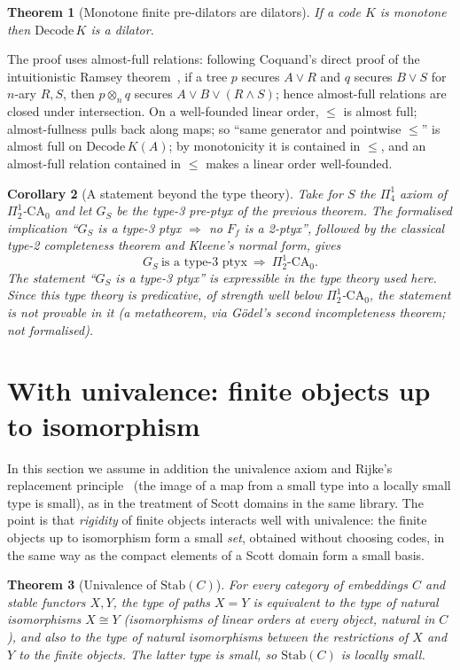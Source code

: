\documentclass[11pt]{article}
\newtheorem{theorem}{Theorem}[section]
\newtheorem{corollary}[theorem]{Corollary}
\theoremstyle{definition}
\theoremstyle{remark}
\newcommand{\Stab}{\mathrm{Stab}}
\begin{document}
\begin{theorem}[Monotone finite pre-dilators are dilators]
If a code $K$ is monotone then $\mathrm{Decode}\,K$ is a dilator.
\end{theorem}

The proof uses almost-full relations: following Coquand's direct proof of
the intuitionistic Ramsey theorem~\cite{CoqRamsey}, if a tree $p$ secures
$A\vee R$ and $q$ secures $B\vee S$ for $n$-ary $R,S$, then $p\otimes_n q$
secures $A\vee B\vee(R\wedge S)$; hence almost-full relations are closed
under intersection. On a well-founded linear order, $\le$ is almost full;
almost-fullness pulls back along maps; so ``same generator and pointwise
$\le$'' is almost full on $\mathrm{Decode}\,K(A)$; by monotonicity it is
contained in $\le$, and an almost-full relation contained in $\le$ makes a
linear order well-founded.

\begin{corollary}[A statement beyond the type theory]
Take for $S$ the $\Pi^1_4$ axiom of $\Pi^1_2$-$\mathrm{CA}_0$ and let $G_S$ be
the type-3 pre-ptyx of the previous theorem. The formalised implication
``$G_S$ is a type-3 ptyx $\Rightarrow$ no $F_f$ is a 2-ptyx'', followed by
the classical type-2 completeness theorem and Kleene's normal form, gives
\[ G_S\ \text{is a type-3 ptyx}\ \Longrightarrow\ \Pi^1_2\text{-}\mathrm{CA}_0 .\]
The statement ``$G_S$ is a type-3 ptyx'' is expressible in the type theory
used here. Since this type theory is predicative, of strength well below
$\Pi^1_2$-$\mathrm{CA}_0$, the statement is not provable in it (a
metatheorem, via G\"odel's second incompleteness theorem; not formalised).
\end{corollary}

\section{With univalence: finite objects up to isomorphism}\label{sec:ua}

In this section we assume in addition the univalence axiom and Rijke's
replacement principle~\cite{Rij} (the image of a map from a small type
into a locally small type is small), as in the treatment of Scott domains
in the same library. The point is that \emph{rigidity} of finite objects
interacts well with univalence: the finite objects up to isomorphism form a
small \emph{set}, obtained without choosing codes, in the same way as the
compact elements of a Scott domain form a small basis.

\begin{theorem}[Univalence of $\Stab(C)$]
For every category of embeddings $C$ and stable functors $X,Y$, the type of
paths $X=Y$ is equivalent to the type of natural isomorphisms $X\cong Y$
(isomorphisms of linear orders at every object, natural in $C$), and also
to the type of natural isomorphisms between the restrictions of $X$ and $Y$
to the finite objects. The latter type is small, so $\Stab(C)$ is locally
small.
\end{theorem}
\end{document}
